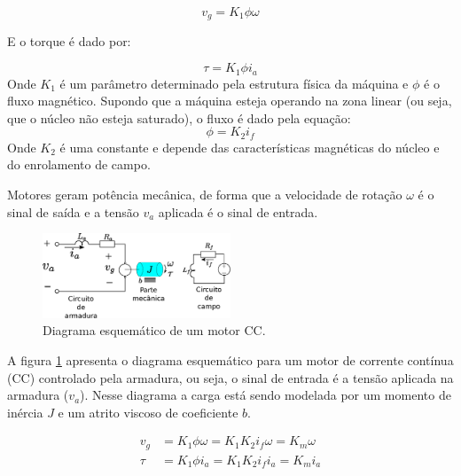 \begin{equation}
    v_g = K_{1}\phi\omega
\end{equation}

E o torque é dado por:

\begin{equation}
    \tau = K_{1} \phi i_a 
\end{equation}Onde $K_1$ é um parâmetro determinado pela estrutura física da máquina e $\phi$ é o fluxo magnético. Supondo que a máquina esteja operando na zona linear (ou seja, que o núcleo não esteja saturado), o fluxo é dado pela equação:
\begin{equation}
    \phi = K_{2}i_f
\end{equation}Onde $K_2$ é uma constante e depende das características magnéticas do núcleo e do enrolamento de campo.

Motores geram potência mecânica, de forma que a velocidade de rotação $\omega$ é o sinal de saída e a tensão $v_a$ aplicada é o sinal de entrada. 

\begin{figure}[H]
    \centering
    \includegraphics[width=0.5\textwidth]{figuras/ilustracoes/esquematico_motor_dc.eps}
    \caption{Diagrama esquemático de um motor CC.}
    \label{fig:modelo_motor_dc}
\end{figure}


A figura \ref{fig:modelo_motor_dc} apresenta o diagrama esquemático para um motor de corrente contínua (CC) controlado pela armadura, ou seja, o sinal de entrada é a tensão aplicada na armadura ($v_a$). Nesse diagrama a carga está sendo modelada por um momento de inércia $J$ e um atrito viscoso de coeficiente $b$.

\begin{align*}
    v_g &= K_{1}\phi\omega= K_{1}K_{2}i_{f}\omega = K_{m}\omega\\
    \tau &= K_{1} \phi i_{a}= K_{1} K_{2}i_{f} i_{a} = K_{m}i_{a}
\end{align*}

